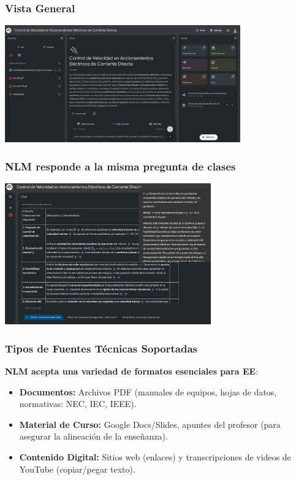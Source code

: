 \documentclass[aspectratio=43]{beamer}
\begin{document}
\begin{frame}
  \frametitle{Vista General}
  \begin{center}
    \includegraphics[width=4in]{nlm.png}
  \end{center}
\end{frame}

\begin{frame}
  \frametitle{NLM responde a la misma pregunta de clases}
  \begin{center}
    \includegraphics[width=3.5in]{indicadores.png}
  \end{center}
\end{frame}

\begin{frame}
\frametitle{Tipos de Fuentes Técnicas Soportadas}

\textbf{NLM acepta una variedad de formatos esenciales para EE}:
\begin{itemize}
    \item \textbf{Documentos:} Archivos PDF (manuales de equipos, hojas de datos, normativas: NEC, IEC, IEEE).
    \item \textbf{Material de Curso:} Google Docs/Slides, apuntes del profesor (para asegurar la alineación de la enseñanza).
    \item \textbf{Contenido Digital:} Sitios web (enlaces) y transcripciones de videos de YouTube (copiar/pegar texto).
\end{itemize}
\end{frame}
\end{document}
